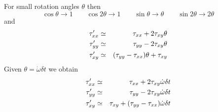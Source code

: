 For small rotation angles $\theta$ then 
\[
\cos \theta \rightarrow 1 
\qquad
\cos 2\theta \rightarrow 1 
\qquad
\sin \theta \rightarrow \theta 
\qquad
\sin 2\theta \rightarrow 2 \theta 
\]
and 
\begin{eqnarray}
\tau_{xx}' &\simeq&  \tau_{xx}  + 2 \tau_{xy} \theta \nonumber\\
\tau_{yy}' &\simeq&  \tau_{yy}  - 2 \tau_{xy} \theta \nonumber\\
\tau_{xy}' &\simeq&  (\tau_{yy}-\tau_{xx}) \theta + \tau_{xy} \nonumber
\end{eqnarray}
Given $\theta= \dot{\omega} \delta t$ we obtain 
\begin{eqnarray}
\tau_{xx}' &\simeq&  \tau_{xx}  + 2 \tau_{xy} \dot{\omega} \delta t  \nonumber\\
\tau_{yy}' &\simeq&  \tau_{yy}  - 2 \tau_{xy}  \dot{\omega} \delta t \nonumber\\
\tau_{xy}' &\simeq&  \tau_{xy}  + (\tau_{yy}-\tau_{xx}) \dot{\omega} \delta t \nonumber
\end{eqnarray}







